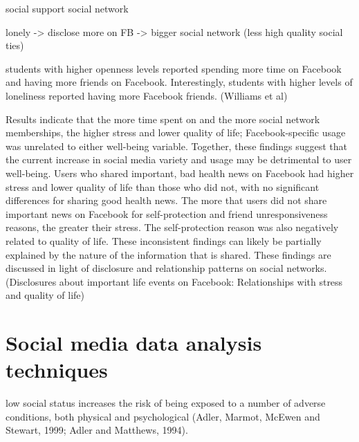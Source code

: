 social support
social network

lonely  -> disclose more on FB -> bigger social network (less high quality social ties)


students with higher openness levels reported spending more time on Facebook and having more friends on Facebook. Interestingly, students with higher levels of loneliness reported having more Facebook friends. (Williams et al)





 Results indicate that the more time spent on and the more social network memberships, the higher stress and lower quality of life; Facebook-specific usage was unrelated to either well-being variable. Together, these findings suggest that the current increase in social media variety and usage may be detrimental to user well-being. Users who shared important, bad health news on Facebook had higher stress and lower quality of life than those who did not, with no significant differences for sharing good health news. The more that users did not share important news on Facebook for self-protection and friend unresponsiveness reasons, the greater their stress. The self-protection reason was also negatively related to quality of life. These inconsistent findings can likely be partially explained by the nature of the information that is shared. These findings are discussed in light of disclosure and relationship patterns on social networks. (Disclosures about important life events on Facebook: Relationships with stress and quality of life)



\section{Social media data analysis techniques}

low social status increases the risk of being exposed to a number of adverse conditions, both physical and psychological (Adler, Marmot, McEwen and Stewart, 1999; Adler and Matthews, 1994). 











